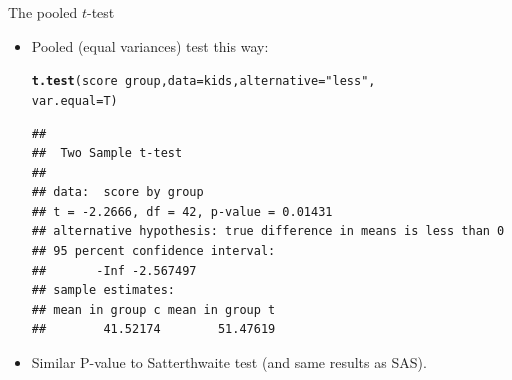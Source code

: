 \documentclass[unknownkeysallowed]{beamer}\usepackage[]{graphicx}\usepackage[]{color}
\makeatletter
\newcommand{\hlstr}[1]{\textcolor[rgb]{0.192,0.494,0.8}{#1}}%
\newcommand{\hlopt}[1]{\textcolor[rgb]{0,0,0}{#1}}%
\newcommand{\hlstd}[1]{\textcolor[rgb]{0.345,0.345,0.345}{#1}}%
\newcommand{\hlkwc}[1]{\textcolor[rgb]{0.333,0.667,0.333}{#1}}%
\newcommand{\hlkwd}[1]{\textcolor[rgb]{0.737,0.353,0.396}{\textbf{#1}}}%
\newenvironment{kframe}{%
 \def\at@end@of@kframe{}%
 \ifinner\ifhmode%
  \def\at@end@of@kframe{\end{minipage}}%
  \begin{minipage}{\columnwidth}%
 \fi\fi%
 \def\FrameCommand##1{\hskip\@totalleftmargin \hskip-\fboxsep
 \colorbox{shadecolor}{##1}\hskip-\fboxsep
     \hskip-\linewidth \hskip-\@totalleftmargin \hskip\columnwidth}%
 \MakeFramed {\advance\hsize-\width
   \@totalleftmargin\z@ \linewidth\hsize
   \@setminipage}}%
 {\par\unskip\endMakeFramed%
 \at@end@of@kframe}
\newenvironment{knitrout}{}{} %
\makeatother
\begin{document}
\begin{frame}[fragile]{The pooled $t$-test}

  \begin{itemize}
  \item Pooled (equal variances) test this way:

\begin{knitrout}
\color{fgcolor}\begin{kframe}
\begin{alltt}
\hlkwd{t.test}\hlstd{(score}\hlopt{~}\hlstd{group,}\hlkwc{data}\hlstd{=kids,}\hlkwc{alternative}\hlstd{=}\hlstr{"less"}\hlstd{,}
  \hlkwc{var.equal}\hlstd{=T)}
\end{alltt}
\begin{verbatim}
## 
## 	Two Sample t-test
## 
## data:  score by group
## t = -2.2666, df = 42, p-value = 0.01431
## alternative hypothesis: true difference in means is less than 0
## 95 percent confidence interval:
##       -Inf -2.567497
## sample estimates:
## mean in group c mean in group t 
##        41.52174        51.47619
\end{verbatim}
\end{kframe}
\end{knitrout}

\item Similar P-value to Satterthwaite test (and same results as SAS).
  \end{itemize}
  
\end{frame}
\end{document}
